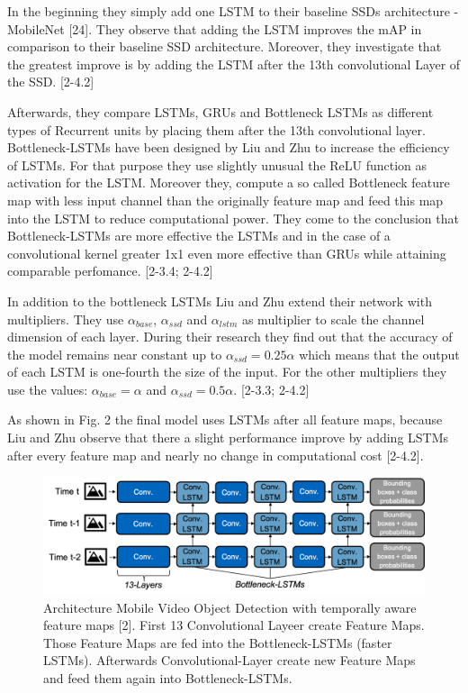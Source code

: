\documentclass[conference]{IEEEtran}
\begin{document}
In the beginning they simply add one LSTM to their baseline SSDs architecture - MobileNet [24]. They observe that adding the LSTM improves the mAP in comparison to their baseline SSD architecture. Moreover, they investigate that the greatest improve is by adding the LSTM after the 13th convolutional Layer of the SSD. [2-4.2] \newline

Afterwards, they compare LSTMs, GRUs and Bottleneck LSTMs as different types of Recurrent units by placing them after the 13th convolutional layer. Bottleneck-LSTMs have been designed by Liu and Zhu to increase the efficiency of LSTMs.  For that purpose they use slightly unusual the ReLU function as activation for the LSTM. Moreover they, compute a so called Bottleneck feature map with less input channel than the originally feature map and feed this map into the LSTM to reduce computational power. They come to the conclusion that Bottleneck-LSTMs are more effective the LSTMs and in the case of a convolutional kernel greater 1x1 even more effective than GRUs while attaining comparable perfomance. [2-3.4; 2-4.2]\newline

In addition to the bottleneck LSTMs Liu and Zhu extend their network with multipliers. They use $\alpha_{base}$, $\alpha_{ssd}$ and $\alpha_{lstm}$ as multiplier to scale the channel dimension of each layer. During their research they find out that the accuracy of the model remains near constant up to $\alpha_{ssd}= 0.25 \alpha$ which means that the output of each LSTM is one-fourth the size of the input. For the other multipliers they use the values: $\alpha_{base} = \alpha$ and $\alpha_{ssd} = 0.5 \alpha$. [2-3.3; 2-4.2] \newline

As shown in Fig. 2 the final model uses LSTMs after all feature maps, because Liu and Zhu observe that there a slight performance improve by adding LSTMs after every feature map and nearly no change in computational cost [2-4.2]. \newline

\begin{figure} [h]
\includegraphics[width=\columnwidth]{Liu_Zhu}
\caption{Architecture Mobile Video Object Detection with temporally aware feature maps [2]. First 13 Convolutional Layeer create Feature Maps. Those Feature Maps are fed into the Bottleneck-LSTMs (faster LSTMs). Afterwards Convolutional-Layer create new Feature Maps and feed them again into Bottleneck-LSTMs.}
\end{figure}
\end{document}
